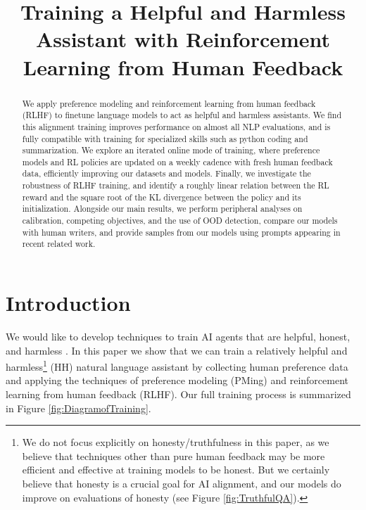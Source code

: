 \title{Training a Helpful and Harmless Assistant with Reinforcement Learning from Human Feedback}

\begin{abstract}
We apply preference modeling and reinforcement learning from human feedback (RLHF) to finetune language models to act as helpful and harmless assistants.  We find this alignment training improves performance on almost all NLP evaluations, and is fully compatible with training for specialized skills such as python coding and summarization.   We explore an iterated online mode of training, where preference models and RL policies are updated on a weekly cadence with fresh human feedback data, efficiently improving our datasets and models.  Finally, we investigate the robustness of RLHF training, and identify a roughly linear  relation between the RL reward and the square root of the KL divergence between the policy and its initialization.   Alongside our main results, we  perform peripheral analyses on calibration, competing objectives, and the use of OOD detection, compare our models with human writers, and provide samples from our models using prompts appearing in recent related work.
\end{abstract}

\section{Introduction}

We would like to develop techniques to train AI agents that are helpful, honest, and harmless \cite{askell2021general}.  In this paper we show that we can train a relatively helpful and harmless\footnote{We do not focus explicitly on honesty/truthfulness in this paper, as we believe that techniques other than pure human feedback may be more efficient and effective at training models to be honest.  But we certainly believe that honesty is a crucial goal for AI alignment, and our models do improve on evaluations of honesty (see Figure \ref{fig:TruthfulQA}).} (HH) natural language assistant by collecting human preference data and applying the techniques of preference modeling (PMing) and reinforcement learning from human feedback (RLHF).  Our full training process is summarized in Figure \ref{fig:DiagramofTraining}.

